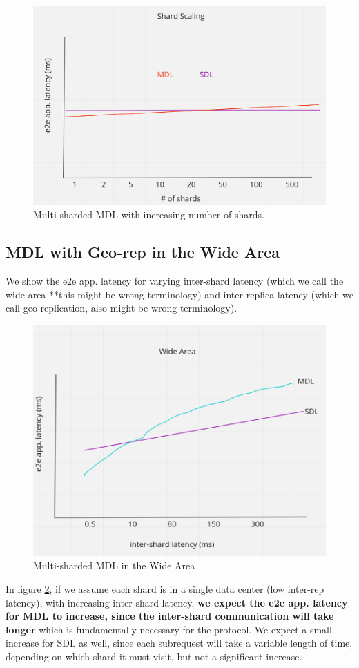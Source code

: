 \begin{figure}[!htb]
\includegraphics[scale=.20]{shard_scaling.png}
\caption{Multi-sharded MDL with increasing number of shards.}
\label{fig:shard-scaling}
\end{figure}

\subsection{MDL with Geo-rep in the Wide Area}
We show the e2e app. latency for varying inter-shard latency (which we call the wide area **this might be wrong terminology) and inter-replica latency (which we call geo-replication, also might be wrong terminology).

\begin{figure}[!htb]
\includegraphics[scale=.24]{wide-area.png}
\caption{Multi-sharded MDL in the Wide Area}
\label{fig:wide-area}
\end{figure}
In figure \ref{fig:wide-area}, if we assume each shard is in a single data center (low inter-rep latency), with increasing inter-shard latency, \textbf{we expect the e2e app. latency for MDL to increase, since the inter-shard communication will take longer} which is fundamentally necessary for the protocol. We expect a small increase for SDL as well, since each subrequest will take a variable length of time, depending on which shard it must visit, but not a significant increase.

